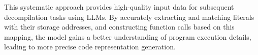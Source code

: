 This systematic approach provides high-quality input data for subsequent decompilation tasks using LLMs. By accurately extracting and matching literals with their storage addresses, and constructing function calls based on this mapping, the model gains a better understanding of program execution details, leading to more precise code representation generation.
